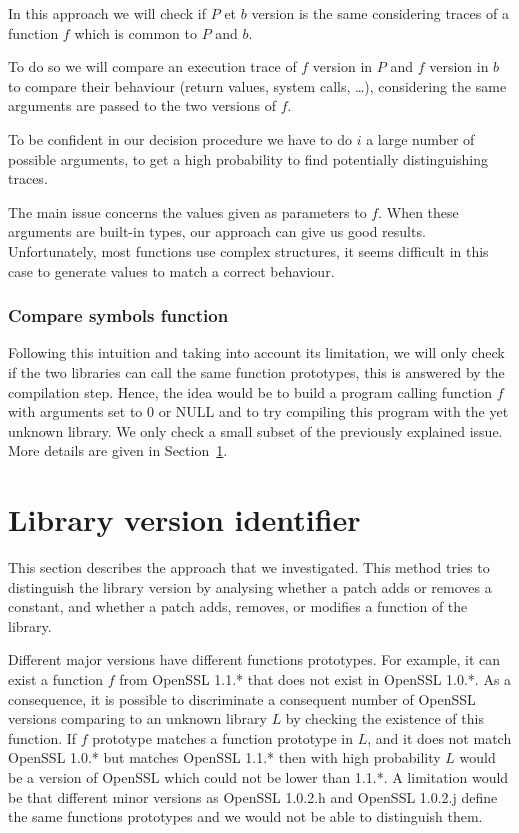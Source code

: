 \documentclass{article}
\begin{document}
    In this approach we will check if $P$ et $b$ version is the same
    considering traces of a function $f$ which is common to $P$ and $b$.

    To do so we will compare an execution trace of $f$
    version in $P$ and $f$ version in $b$ to compare their behaviour (return
    values, system calls, \dots),
    considering the same arguments are passed to the two versions of $f$. 

    To be confident in our decision procedure we have to do $i$ a large number
    of possible arguments, to get a high probability to find potentially distinguishing
    traces.

    The main issue concerns the values given as parameters to $f$. When these arguments
    are built-in types, our approach can give us good results. Unfortunately,
    most functions use complex structures, it seems difficult in this case to
    generate values to match a correct behaviour.
	
	\subsubsection{Compare symbols function}
	
    Following this intuition and taking into account its limitation, we will
    only check if the two libraries can call the same function prototypes,
    this is answered by the compilation step.
    Hence, the idea would be to build a program calling function $f$ with
    arguments set to $0$ or NULL and to try compiling this program with the
    yet unknown library. We only check a small subset of the previously explained
    issue. More details are given in Section~\ref{section:libraryChecker}.

\section{Library version identifier}
\label{section:libraryChecker}

    This section describes the approach that we investigated. This method
    tries to distinguish the library version by analysing whether a patch adds
    or removes a constant, and whether a patch adds, removes, or modifies a
    function of the library.
	   
    Different major versions have different functions prototypes. For example,
    it can exist a function $f$ from OpenSSL 1.1.* that does not exist in
    OpenSSL 1.0.*. As a consequence, it is possible to discriminate a
    consequent number of OpenSSL versions comparing to an unknown library $L$ by checking the existence
    of this function. If $f$ prototype matches a function prototype in $L$,
    and it does not match OpenSSL 1.0.* but matches OpenSSL 1.1.* then with
    high probability $L$ would be a version of OpenSSL which could not be
    lower than 1.1.*. A limitation would be that different minor
    versions as OpenSSL 1.0.2.h and OpenSSL 1.0.2.j define the same functions
    prototypes and we would not be able to distinguish them.
   
\end{document}
